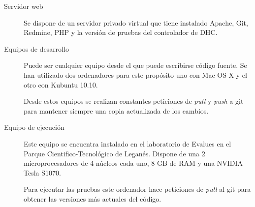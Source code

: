 \begin{description}
	\item[Servidor web] Se dispone de un servidor privado virtual que tiene instalado Apache, Git, Redmine, PHP y la versión de pruebas del controlador de DHC.
	
	\item[Equipos de desarrollo] Puede ser cualquier equipo desde el que puede escribirse código fuente. Se han utilizado dos ordenadores para este propósito uno con Mac OS X y el otro con Kubuntu 10.10.
	
	Desde estos equipos se realizan constantes peticiones de \emph{pull} y \emph{push} a git para mantener siempre una copia actualizada de los cambios.
	
	\item[Equipo de ejecución] Este equipo se encuentra instalado en el laboratorio de Evalues en el Parque Cientifico-Tecnológico de Leganés. Dispone de una 2 microprocesadores de 4 núcleos cada uno, 8 GB de RAM y una NVIDIA Tesla S1070.
	
	Para ejecutar las pruebas este ordenador hace peticiones de \emph{pull} al git para obtener las versiones más actuales del código.
\end{description}





